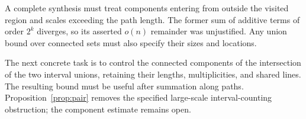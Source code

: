 \documentclass[11pt,letterpaper]{article}
\begin{document}
A complete synthesis must treat components entering from outside the visited region and scales exceeding the path length. The former sum of additive terms of order $2^k$ diverges, so its asserted $o(n)$ remainder was unjustified. Any union bound over connected sets must also specify their sizes and locations.

The next concrete task is to control the connected components of the intersection of the two interval unions, retaining their lengths, multiplicities, and shared lines. The resulting bound must be useful after summation along paths. Proposition~\ref{prop:pair} removes the specified large-scale interval-counting obstruction; the component estimate remains open.



\end{document}

